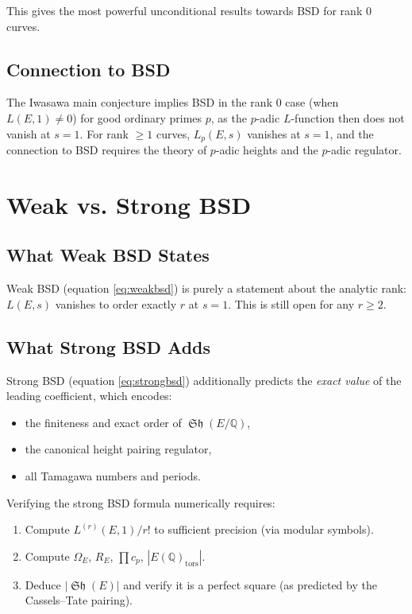 \documentclass[12pt,a4paper]{article}
\theoremstyle{remark}
\DeclareMathOperator{\Sha}{\mathfrak{Sh}}
\begin{document}
This gives the most powerful unconditional results towards BSD for rank 0 curves.

\subsection{Connection to BSD}

The Iwasawa main conjecture implies BSD in the rank 0 case (when $L(E,1) \neq 0$) for
good ordinary primes $p$, as the $p$-adic $L$-function then does not vanish at $s=1$.
For rank $\geq 1$ curves, $L_p(E,s)$ vanishes at $s=1$, and the connection to BSD
requires the theory of $p$-adic heights and the $p$-adic regulator.

\section{Weak vs. Strong BSD}

\subsection{What Weak BSD States}

Weak BSD (equation \eqref{eq:weakbsd}) is purely a statement about the analytic rank:
$L(E,s)$ vanishes to order exactly $r$ at $s=1$.  This is still open for any $r \geq 2$.

\subsection{What Strong BSD Adds}

Strong BSD (equation \eqref{eq:strongbsd}) additionally predicts the \emph{exact value}
of the leading coefficient, which encodes:
\begin{itemize}[nosep]
  \item the finiteness and exact order of $\Sha(E/\mathbb{Q})$,
  \item the canonical height pairing regulator,
  \item all Tamagawa numbers and periods.
\end{itemize}

Verifying the strong BSD formula numerically requires:
\begin{enumerate}[nosep]
  \item Compute $L^{(r)}(E,1)/r!$ to sufficient precision (via modular symbols).
  \item Compute $\Omega_E$, $R_E$, $\prod c_p$, $|E(\mathbb{Q})_{\mathrm{tors}}|$.
  \item Deduce $|\Sha(E)|$ and verify it is a perfect square (as predicted by the
        Cassels--Tate pairing).
\end{enumerate}
\end{document}
